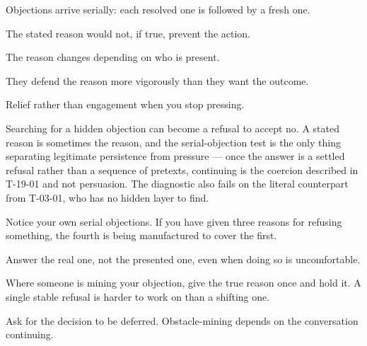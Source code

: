 \begin{feedback}
  \item Objections arrive serially: each resolved one is followed by a fresh one.
  \item The stated reason would not, if true, prevent the action.
  \item The reason changes depending on who is present.
  \item They defend the reason more vigorously than they want the outcome.
  \item Relief rather than engagement when you stop pressing.
\end{feedback}

\begin{failure}
Searching for a hidden objection can become a refusal to accept no. A stated reason is sometimes the reason, and the serial-objection test is the only thing separating legitimate persistence from pressure --- once the answer is a settled refusal rather than a sequence of pretexts, continuing is the coercion described in T-19-01 and not persuasion. The diagnostic also fails on the literal counterpart from T-03-01, who has no hidden layer to find.
\end{failure}

\begin{countermeasures}
  \item Notice your own serial objections. If you have given three reasons for refusing something, the fourth is being manufactured to cover the first.
  \item Answer the real one, not the presented one, even when doing so is uncomfortable.
  \item Where someone is mining your objection, give the true reason once and hold it. A single stable refusal is harder to work on than a shifting one.
  \item Ask for the decision to be deferred. Obstacle-mining depends on the conversation continuing.
\end{countermeasures}

\seesources
{}
